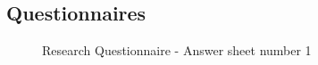 \documentclass[a4paper]{article}
\begin{document}
\begin{appendices}
	\section{Questionnaires}
	\begin{figure}[h!]
		\caption{Research Questionnaire - Answer sheet number 1}
	\end{figure}
	\newpage
	\begin{figure}[h!]
		\centering{
}
\end{figure}
\end{appendices}
\end{document}
